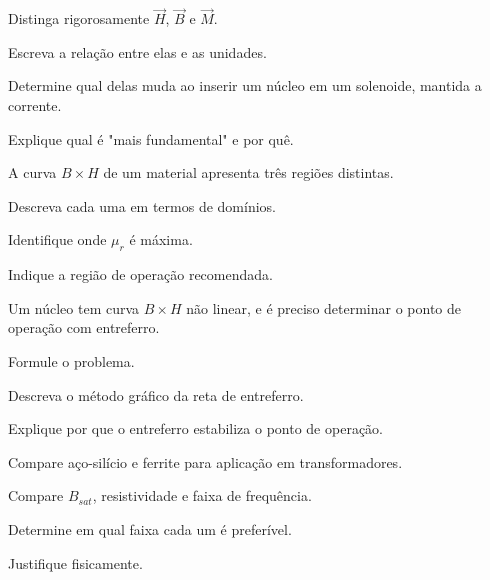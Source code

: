 \blocoaprofundamento
\begin{questao}[3]{}

Distinga rigorosamente $\vec H$, $\vec B$ e $\vec M$.
\begin{itensq}
\item Escreva a relação entre elas e as unidades.
\item Determine qual delas muda ao inserir um núcleo em um solenoide, mantida a
      corrente.
\item Explique qual é "mais fundamental" e por quê.
\end{itensq}


\end{questao}
\begin{questao}[3]{}

A curva $B\times H$ de um material apresenta três regiões distintas.
\begin{itensq}
\item Descreva cada uma em termos de domínios.
\item Identifique onde $\mu_r$ é máxima.
\item Indique a região de operação recomendada.
\end{itensq}


\end{questao}
\begin{questao}[3]{}

Um núcleo tem curva $B\times H$ não linear, e é preciso determinar o ponto de
operação com entreferro.
\begin{itensq}
\item Formule o problema.
\item Descreva o método gráfico da reta de entreferro.
\item Explique por que o entreferro estabiliza o ponto de operação.
\end{itensq}


\end{questao}
\begin{questao}[3]{}

Compare aço-silício e ferrite para aplicação em transformadores.
\begin{itensq}
\item Compare $B_{sat}$, resistividade e faixa de frequência.
\item Determine em qual faixa cada um é preferível.
\item Justifique fisicamente.
\end{itensq}


\end{questao}
